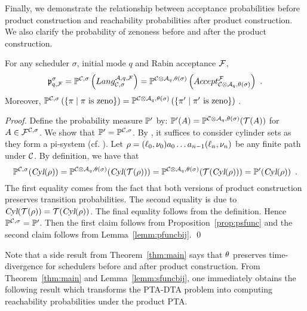 Finally, we demonstrate the relationship between acceptance probabilities before product construction and reachability probabilities after product construction.
We also clarify the probability of zenoness before and after the product construction.

\vspace{-0.8em}
\begin{theorem}\label{thm:main}
For any scheduler $\sigma$, initial mode $q$ and Rabin acceptance $\mathcal{F}$,
\[
    \mathfrak{p}_{q,\mathcal{F}}^{\sigma}
        =
            \mathbb{P}
                ^{\mathcal{C},\sigma}
                \left(
                    Lang _{\mathcal{C},\sigma} ^{\mathcal{A},q,\mathcal{F}}
                \right)
        =
            \mathbb{P}
                ^{{\mathcal{C}}{\otimes}{\mathcal{A}_q},\theta(\sigma)}
                \left(
                    Accept _{ {\mathcal{C}}{\otimes}{\mathcal{A}_q}, \theta \left( \sigma \right) } ^{\mathcal{F}}
                \right) 
    ~. 
\]
Moreover, 
$
    \mathbb{P}
        ^{\mathcal{C},\sigma}
        \left( \{
                \pi \mid \pi \mbox{ is zeno}
            \}
        \right)
    =
    \mathbb{P}
        ^{{\mathcal{C}}{\otimes}{\mathcal{A}_q},\theta(\sigma)}
        \left( \{  
                \pi' \mid \pi' \mbox{ is zeno}
            \}
        \right)
$
\enskip.
\end{theorem}
\vspace{-0.8em}
\begin{proof}
Define the probability measure $\mathbb{P}'$ by: $\mathbb{P}'(A)=\mathbb{P}^{{\mathcal{C}}{\otimes}{\mathcal{A}_q},\theta\left(\sigma\right)}(\mathcal{T}(A))$ for $A\in\mathcal{F}^{\mathcal{C},\sigma}$. We show that $\mathbb{P}'=\mathbb{P}^{\mathcal{C},\sigma}$. By \cite[Theorem 3.3]{PBMeasure}, it suffices to consider cylinder sets as they form a pi-system (cf. \cite[Page 43]{PBMeasure}).
Let $\rho=(\ell_0,\nu_0)a_0\dots a_{n-1}(\ell_n,\nu_n)$ be any finite path under $\mathcal{C}$.
By definition, we have that
\[
\mathbb{P}^{\mathcal{C},\sigma}(\mbox{\sl Cyl}(\rho))=\mathbb{P}^{{\mathcal{C}}{\otimes}{\mathcal{A}_q}, \theta\left(\sigma\right)}(\mbox{\sl Cyl}(\mathcal{T}(\rho)))=\mathbb{P}^{{\mathcal{C}}{\otimes}{\mathcal{A}_q},\theta\left(\sigma\right)}(\mathcal{T}(\mbox{\sl Cyl}(\rho)))=\mathbb{P}'(\mbox{\sl Cyl}(\rho))\enskip.
\]
The first equality comes from the fact that both versions of product construction preserves transition probabilities. The second equality is due to $\mbox{\sl Cyl}(\mathcal{T}(\rho))= \mathcal{T}(\mbox{\sl Cyl}(\rho))$.
The final equality follows from the definition.
Hence $\mathbb{P}^{\mathcal{C},\sigma}=\mathbb{P}'$.
Then the first claim follows from Proposition~\ref{prop:psfunc} and the second claim follows from Lemma~\ref{lemm:pfuncbij}. \qed
\end{proof}
Note that a side result from Theorem~\ref{thm:main} says that $\theta$ preserves time-divergence for schedulers before and after product construction.
From Theorem~\ref{thm:main} and Lemma~\ref{lemm:sfuncbij}, one immediately obtains the following result which transforms the {\sc PTA-DTA} problem into computing reachability probabilities under the product PTA.


